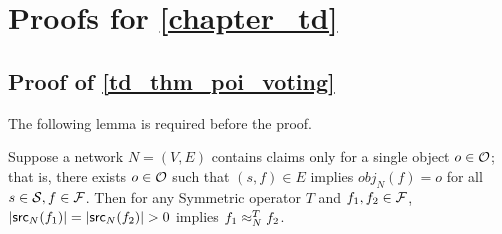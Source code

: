 \chapter{Proofs for \cref{chapter_td}}
\label{chapter_td_proofs}

\label{app:proofs}

\section{Proof of \cref{td_thm_poi_voting}}

The following lemma is required before the proof.

\begin{lemma}
\label{td_lemma_poi_voting_lemma}

Suppose a network $N=(V, E)$ contains claims only for a single object $o \in
\mathcal{O}$; that is, there exists $o \in \mathcal{O}$ such that $(s, f) \in E$ implies
$obj_N(f) = o$ for all $s \in \mathcal{S}, f \in \mathcal{F}$. Then for any Symmetric operator
$T$ and $f_1, f_2 \in \mathcal{F}$, $|\mathsf{src}_N(f_1)| = |\mathsf{src}_N(f_2)| > 0$ implies $f_1
\approx_N^T f_2$.

\end{lemma}

